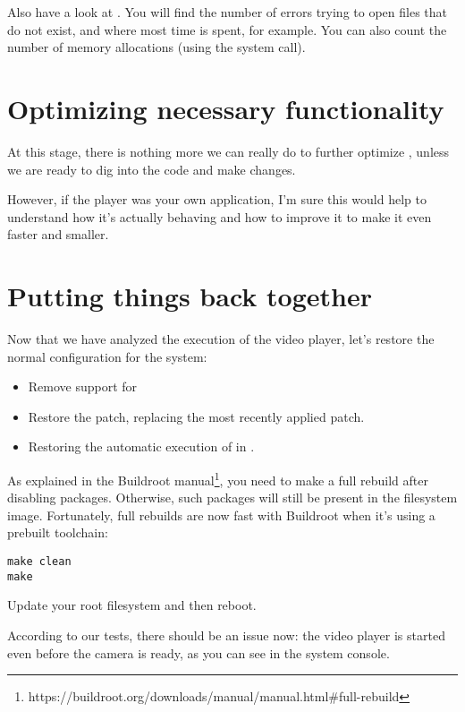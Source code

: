 Also have a look at . You will find the number
of errors trying to open files that do not exist, and where most time is
spent, for example. You can also count the number of memory allocations
(using the  system call).

\section{Optimizing necessary functionality}

At this stage, there is nothing more we can really do to further
optimize , unless we are ready to dig into the code and
make changes.

However, if the player was your own application, I'm sure this would
help to understand how it's actually behaving and how to improve it to
make it even faster and smaller.

\section{Putting things back together}

Now that we have analyzed the execution of the video player, let's
restore the normal configuration for the system:

\begin{itemize}
\item Remove support for 
\item Restore the
       patch,
      replacing the most recently applied patch.
\item Restoring the automatic execution of  in
      .
\end{itemize}


As explained in the Buildroot
manual\footnote{https://buildroot.org/downloads/manual/manual.html\#full-rebuild},
you need to make a full rebuild after disabling packages. Otherwise,
such packages will still be present in the filesystem image. Fortunately,
full rebuilds are now fast with Buildroot when it's using a prebuilt toolchain:

\begin{verbatim}
make clean
make
\end{verbatim}

Update your root filesystem and then reboot.

According to our tests, there should be an issue now: the video player
is started even before the camera is ready, as you can see in the system
console.

